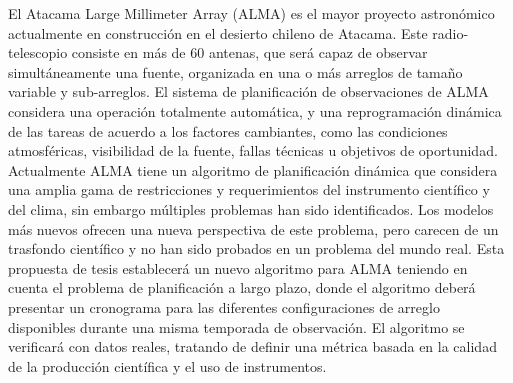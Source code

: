 El Atacama Large Millimeter Array (ALMA) es el mayor proyecto astron\'omico actualmente en
construcci\'on en el desierto chileno de Atacama. Este radio-telescopio consiste en m\'as de 60
antenas, que ser\'a capaz de observar simult\'aneamente una fuente, organizada en una o m\'as arreglos
de tama\~no variable y sub-arreglos. El sistema de planificaci\'on de observaciones de ALMA
considera una operaci\'on totalmente autom\'atica, y una reprogramaci\'on din\'amica de las tareas de
acuerdo a los factores cambiantes, como las condiciones atmosf\'ericas, visibilidad de la fuente,
fallas t\'ecnicas u objetivos de oportunidad.
Actualmente ALMA tiene un algoritmo de planificaci\'on din\'amica que considera una amplia
gama de restricciones y requerimientos del instrumento cient\'ifico y del clima, sin embargo
m\'ultiples problemas han sido identificados. Los modelos m\'as nuevos ofrecen una nueva
perspectiva de este problema, pero carecen de un trasfondo cient\'ifico y no han sido probados en
un problema del mundo real. Esta propuesta de tesis establecer\'a un nuevo algoritmo para ALMA
teniendo en cuenta el problema de planificaci\'on a largo plazo, donde el algoritmo deber\'a presentar
un cronograma para las diferentes configuraciones de arreglo disponibles durante una misma
temporada de observaci\'on. El algoritmo se verificar\'a con datos reales, tratando de definir una
m\'etrica basada en la calidad de la producci\'on cient\'ifica y el uso de instrumentos.
\vfill

\cleardoublepage